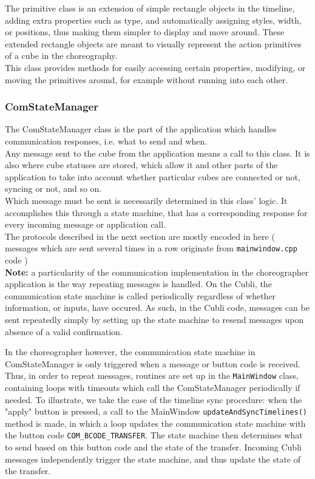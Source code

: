 The primitive class is an extension of simple rectangle objects in the timeline, adding extra properties such as type, and automatically assigning styles, width, or positions, thus making them simpler to display and move around. These extended rectangle objects are meant to visually represent the action primitives of a cube in the choreography.\\

This class provides methods for easily accessing certain properties, modifying, or moving the primitives around, for example without running into each other.

\subsubsection{ComStateManager}

 The ComStateManager class is the part of the application which handles communication responses, i.e. what to send and when.\\
 
Any message sent to the cube from the application means a call to this class. It is also where cube statuses are stored, which allow it and other parts of the application to take into account whether particular cubes are connected or not, syncing or not, and so on.\\

Which message must be sent is necessarily determined in this class' logic.
It accomplishes this through a state machine, that has a corresponding response for every incoming message or application call.\\

The protocols described in the next section are mostly encoded in here ( messages which are sent several times in a row originate from \texttt{mainwindow.cpp} code )\\

\textbf{Note:} a particularity of the communication implementation in the choreographer application is the way repeating messages is handled. On the Cubli, the communication state machine is called periodically regardless of whether information, or inputs, have occured. As such, in the Cubli code, messages can be sent repeatedly simply by setting up the state machine to resend messages upon absence of a valid confirmation.

In the choreographer however, the communication state machine in ComStateManager is only triggered when a message or button code is received. Thus, in order to repeat messages, routines are set up in the \texttt{MainWindow} class, containing loops with timeouts which call the ComStateManager periodically if needed. To illustrate, we take the case of the timeline sync procedure: when the "apply" button is pressed, a call to the MainWindow \texttt{updateAndSyncTimelines()} method is made, in which a loop updates the communication state machine with the button code \texttt{COM\_BCODE\_TRANSFER}. The state machine then determines what to send based on this button code and the state of the transfer. Incoming Cubli messages independently trigger the state machine, and thus update the state of the transfer.

